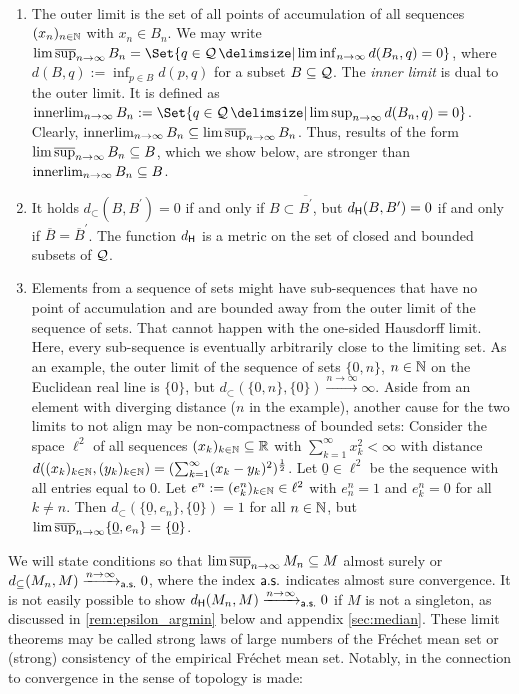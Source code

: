 %
\begin{remark}
\mbox{ }
\begin{enumerate}[label=(\roman*)]
	\item 
		The outer limit is the set of all points of accumulation of all sequences $(x_n)_{n\in\mathbb{N}}$ with $x_n\in B_n$. We may write $\outerlim_{n\to\infty} B_n = \Set{q\in\mc Q \given \liminf_{n\to\infty} d(B_n, q) = 0}$, where $d(B, q) := \inf_{p\in B} d(p, q)$ for a subset $B\subseteq\mathcal{Q}$. The \textit{inner limit} is dual to the outer limit. It is defined as $\innerlim_{n\to\infty} B_n := \Set{q\in\mc Q \given \limsup_{n\to\infty} d(B_n, q) = 0}$. Clearly, $\operatorname*{innerlim}_{n\to\infty} B_n \subseteq \operatorname*{lim\, \overline{sup}}_{n\to\infty} B_n$. Thus, results of the form $\operatorname*{lim\, \overline{sup}}_{n\to\infty} B_n \subseteq B$, which we show below, are stronger than $\operatorname*{innerlim}_{n\to\infty} B_n \subseteq B$.
	\item 
		It holds $d_\subset(B,B^\prime)=0$ if and only if $B \subset \overline{B^\prime}$, but $d_{\mathsf{H}}(B,B^\prime)=0$ if and only if $\overline B = \overline B^ \prime$. The function $d_{\mathsf{H}}$ is a metric on the set of closed and bounded subsets of $\mathcal{Q}$.
	\item 
		Elements from a sequence of sets might have sub-sequences that have no point of accumulation and are bounded away from the outer limit of the sequence of sets. That cannot happen with the one-sided Hausdorff limit. Here, every sub-sequence is eventually arbitrarily close to the limiting set. As an example, the outer limit of the sequence of sets $\{0,n\}$, $n\in\mathbb{N}$ on the Euclidean real line is $\{0\}$, but $d_\subset(\{0,n\},\{0\})\xrightarrow{n\to\infty}\infty$. Aside from an element with diverging distance ($n$ in the example), another cause for the two limits to not align may be non-compactness of bounded sets: Consider the space $\ell^2$ of all sequences $(x_k)_{k\in\mathbb{N}}\subseteq\mathbb{R}$ with $\sum_{k=1}^\infty x_k^2 < \infty$ with distance $d((x_k)_{k\in\mathbb{N}}, (y_k)_{k\in\mathbb{N}}) = (\sum_{k=1}^\infty (x_k-y_k)^2)^\frac12$. Let $\underline{0}\in\ell^2$ be the sequence with all entries equal to 0. Let $e^n := (e^n_k)_{k\in\mathbb{N}}\in\ell^2$ with $e_n^n=1$ and $e^n_k=0$ for all $k\neq n$. Then $d_\subset(\{\underline 0, e_n\}, \{\underline 0\}) = 1$ for all $n\in\mathbb{N}$, but $\operatorname*{lim\, \overline{sup}}_{n\to\infty} \{\underline 0, e_n\} = \{\underline 0\}$.
\end{enumerate}
\end{remark}
%
We will state conditions so that $\operatorname*{lim\, \overline{sup}}_{n\to\infty} M_n \subseteq M$ almost surely or $d_\subseteq(M_n, M) \xrightarrow{n\to\infty}_{\mathsf{a.s.}} 0$, where the index $\mathsf{a.s.}$ indicates almost sure convergence. It is not easily possible to show $d_{\mathsf{H}}(M_n, M) \xrightarrow{n\to\infty}_{\mathsf{a.s.}} 0$ if $M$ is not a singleton, as discussed in \autoref{rem:epsilon_argmin} below and appendix \ref{sec:median}. These limit theorems may be called strong laws of large numbers of the Fréchet mean set or (strong) consistency of the empirical Fréchet mean set. Notably, in \cite{evans20} the connection to convergence in the sense of topology is made:
